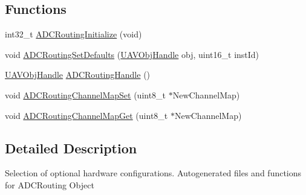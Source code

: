 \subsection*{\-Functions}
\begin{DoxyCompactItemize}
\item 
int32\-\_\-t \hyperlink{group___a_d_c_routing_ga86427a9cf1fa9a988649f4aa6655b660}{\-A\-D\-C\-Routing\-Initialize} (void)
\item 
void \hyperlink{group___a_d_c_routing_ga6df32f111c91880fd0a711f825ee4051}{\-A\-D\-C\-Routing\-Set\-Defaults} (\hyperlink{targets_2_u_a_v_objects_2inc_2uavobjectmanager_8h_a279053e22be53ce9f895043aaeb91e3b}{\-U\-A\-V\-Obj\-Handle} obj, uint16\-\_\-t inst\-Id)
\item 
\hyperlink{targets_2_u_a_v_objects_2inc_2uavobjectmanager_8h_a279053e22be53ce9f895043aaeb91e3b}{\-U\-A\-V\-Obj\-Handle} \hyperlink{group___a_d_c_routing_gad9e4b9129079b7e8d4385a5564e293e3}{\-A\-D\-C\-Routing\-Handle} ()
\item 
void \hyperlink{group___a_d_c_routing_ga49cd4d88476d1b1d065899dd8bc2b4ae}{\-A\-D\-C\-Routing\-Channel\-Map\-Set} (uint8\-\_\-t $\ast$\-New\-Channel\-Map)
\item 
void \hyperlink{group___a_d_c_routing_gac61dbc5d4907d24ec0b5a2447d93cf61}{\-A\-D\-C\-Routing\-Channel\-Map\-Get} (uint8\-\_\-t $\ast$\-New\-Channel\-Map)
\end{DoxyCompactItemize}


\subsection{\-Detailed \-Description}
\-Selection of optional hardware configurations. \-Autogenerated files and functions for \-A\-D\-C\-Routing \-Object 

